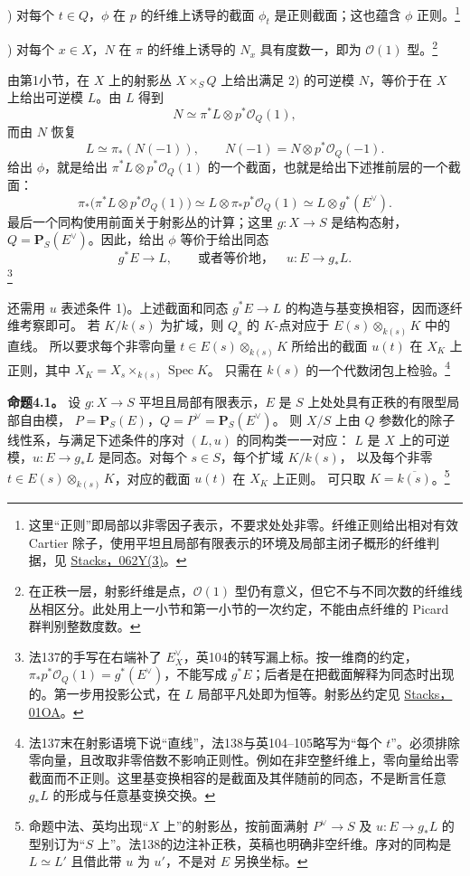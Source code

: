\documentclass[openany,fontset=fandol]{ctexbook}
\DeclareMathOperator{\Spec}{Spec}
\newcommand{\OO}{\mathcal O}
\begin{document}
) 对每个 \(t\in Q\)，\(\phi\) 在 \(p\) 的纤维上诱导的截面 \(\phi_t\) 是正则截面；这也蕴含 \(\phi\) 正则。\footnote{这里“正则”即局部以非零因子表示，不要求处处非零。纤维正则给出相对有效 Cartier 除子，使用平坦且局部有限表示的环境及局部主闭子概形的纤维判据，见 \href{https://stacks.math.columbia.edu/tag/062Y}{Stacks，062Y(3)}。}

) 对每个 \(x\in X\)，\(N\) 在 \(\pi\) 的纤维上诱导的 \(N_x\) 具有度数一，即为 \(\OO(1)\) 型。\footnote{在正秩一层，射影纤维是点，\(\OO(1)\) 型仍有意义，但它不与不同次数的纤维线丛相区分。此处用上一小节和第一小节的一次约定，不能由点纤维的 Picard 群判别整数度数。}

由第1小节，在 \(X\) 上的射影丛 \(X\times_S Q\) 上给出满足 2) 的可逆模 \(N\)，等价于在 \(X\) 上给出可逆模 \(L\)。由 \(L\) 得到
\[
 N\simeq \pi^*L\otimes p^*\OO_Q(1),
\]
而由 \(N\) 恢复
\[
 L\simeq \pi_*(N(-1)),\qquad N(-1)=N\otimes p^*\OO_Q(-1).
\]
给出 \(\phi\)，就是给出 \(\pi^*L\otimes p^*\OO_Q(1)\) 的一个截面，也就是给出下述推前层的一个截面：
\[
 \pi_*\bigl(\pi^*L\otimes p^*\OO_Q(1)\bigr)
 \simeq L\otimes\pi_*p^*\OO_Q(1)
 \simeq L\otimes g^*(E^\vee).
\]
最后一个同构使用前面关于射影丛的计算；这里 \(g:X\to S\) 是结构态射，\(Q=\mathbf P_S(E^\vee)\)。因此，给出 \(\phi\) 等价于给出同态
\[
 g^*E\longrightarrow L,
 \qquad\text{或者等价地，}\quad u:E\longrightarrow g_*L.
\]
\footnote{法137的手写在右端补了 \(E_X^\vee\)，英104的转写漏上标。按一维商的约定，\(\pi_*p^*\OO_Q(1)=g^*(E^\vee)\)，不能写成 \(g^*E\)；后者是在把截面解释为同态时出现的。第一步用投影公式，在 \(L\) 局部平凡处即为恒等。射影丛约定见 \href{https://stacks.math.columbia.edu/tag/01OA}{Stacks，01OA}。}

还需用 \(u\) 表述条件 1)。上述截面和同态 \(g^*E\to L\) 的构造与基变换相容，因而逐纤维考察即可。
若 \(K/k(s)\) 为扩域，则 \(Q_s\) 的 \(K\)-点对应于 \(E(s)\otimes_{k(s)} K\) 中的直线。
所以要求每个非零向量 \(t\in E(s)\otimes_{k(s)}K\) 所给出的截面 \(u(t)\) 在 \(X_K\) 上正则，其中 \(X_K=X_s\times_{k(s)}\Spec K\)。
只需在 \(k(s)\) 的一个代数闭包上检验。\footnote{法137末在射影语境下说“直线”，法138与英104--105略写为“每个 \(t\)”。必须排除零向量，且改取非零倍数不影响正则性。例如在非空整纤维上，零向量给出零截面而不正则。这里基变换相容的是截面及其伴随前的同态，不是断言任意 \(g_*L\) 的形成与任意基变换交换。}

\medskip\noindent\textbf{命题4.1。}
设 \(g:X\to S\) 平坦且局部有限表示，\(E\) 是 \(S\) 上处处具有正秩的有限型局部自由模，
\(P=\mathbf P_S(E)\)，\(Q=P^\vee=\mathbf P_S(E^\vee)\)。
则 \(X/S\) 上由 \(Q\) 参数化的除子线性系，与满足下述条件的序对 \((L,u)\) 的同构类一一对应：
\(L\) 是 \(X\) 上的可逆模，\(u:E\to g_*L\) 是同态。对每个 \(s\in S\)，每个扩域 \(K/k(s)\)，
以及每个非零 \(t\in E(s)\otimes_{k(s)}K\)，对应的截面 \(u(t)\) 在 \(X_K\) 上正则。
可只取 \(K=\overline{k(s)}\)。\footnote{命题中法、英均出现“\(X\) 上”的射影丛，按前面满射 \(P^\vee\to S\) 及 \(u:E\to g_*L\) 的型别订为“\(S\) 上”。法138的边注补正秩，英稿也明确非空纤维。序对的同构是 \(L\simeq L'\) 且借此带 \(u\) 为 \(u'\)，不是对 \(E\) 另换坐标。}
\end{document}
